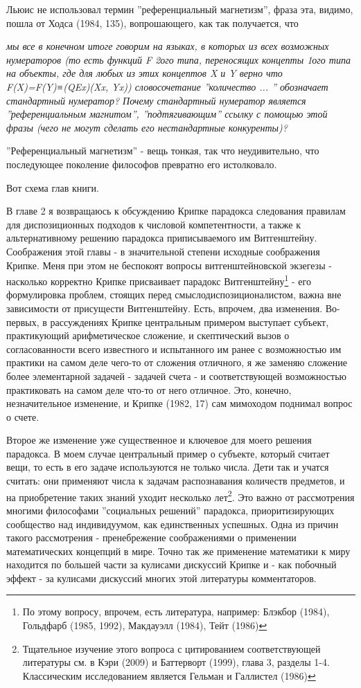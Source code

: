 \documentclass{book}
\begin{document}
Льюис не использовал термин ''референциальный магнетизм'', фраза эта, видимо, пошла от Ходса (1984, 135), вопрошающего, как так получается, что

\textit{мы все в конечном итоге говорим на языках, в которых из всех возможных нумераторов (то есть функций F 2ого типа, переносящих концепты 1ого типа на объекты, где для любых из этих концептов X и Y верно что F(X)=F(Y)≡(QEx)(Xx, Yx)) словосочетание ''количество ... '' обозначает стандартный нумератор? Почему стандартный нумератор является ''референциальным магнитом'', ''подтягивающим'' ссылку с помощью этой фразы (чего не могут сделать его нестандартные конкуренты)?}

''Референциальный магнетизм'' - вещь тонкая, так что неудивительно, что последующее поколение философов превратно его истолковало.

Вот схема глав книги.

В главе 2 я возвращаюсь к обсуждению Крипке парадокса следования правилам для диспозиционных подходов к числовой компетентности, а также к альтернативному решению парадокса приписываемого им Витгенштейну. Соображения этой главы - в значительной степени исходные соображения Крипке. Меня при этом не беспокоят вопросы витгенштейновской экзегезы - насколько корректно Крипке присваивает парадокс Витгенштейну\footnote{По этому вопросу, впрочем, есть литература, например: Блэкбор (1984), Гольдфарб (1985, 1992), Макдауэлл (1984), Тейт (1986)} - его формулировка проблем, стоящих перед смыслодиспозиционалистом, важна вне зависимости от присущести Витгенштейну. Есть, впрочем, два изменения. Во-первых, в рассуждениях Крипке центральным примером выступает субъект, практикующий арифметическое сложение, и скептический вызов о согласованности всего известного и испытанного им ранее с возможностью им практики на самом деле чего-то от сложения отличного, я же заменяю сложение более элементарной задачей - задачей счета - и соответствующей возможностью практиковать на самом деле что-то от него отличное. Это, конечно, незначительное изменение, и Крипке (1982, 17) сам мимоходом поднимал вопрос о счете.

Второе же изменение уже существенное и ключевое для моего решения парадокса. В моем случае центральный пример о субъекте, который считает вещи, то есть в его задаче используются не только числа. Дети так и учатся считать: они применяют числа к задачам распознавания количеств предметов, и на приобретение таких знаний уходит несколько лет\footnote{Тщательное изучение этого вопроса с цитированием соответствующей литературы см. в Кэри (2009) и Баттерворт (1999), глава 3, разделы 1-4. Классическим исследованием является Гельман и Галлистел (1986)}. Это важно от рассмотрения многими философами ''социальных решений'' парадокса, приоритизирующих сообщество над индивидуумом, как единственных успешных. Одна из причин такого рассмотрения - пренебрежение соображениями о применении математических концепций в мире. Точно так же применение математики к миру находится по большей части за кулисами дискуссий Крипке и - как побочный эффект - за кулисами дискуссий многих этой литературы комментаторов.
\end{document}

